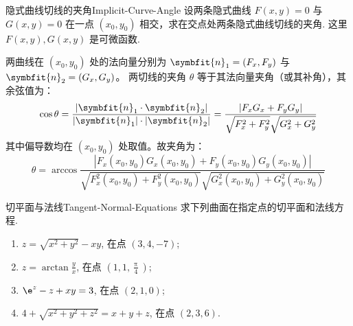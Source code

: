 \begin{problem}{隐式曲线切线的夹角}{Implicit-Curve-Angle}
    设两条隐式曲线 $F(x, y) = 0$ 与 $G(x, y) = 0$ 在一点 $(x_0, y_0)$ 相交，求在交点处两条隐式曲线切线的夹角. 这里 $F(x, y), G(x, y)$ 是可微函数.
\end{problem}

\begin{solution}
    两曲线在 $(x_0, y_0)$ 处的法向量分别为 $\symbfit{n}_1 = (F_x, F_y)$ 与 $\symbfit{n}_2 = (G_x, G_y)$。
    两切线的夹角 $\theta$ 等于其法向量夹角（或其补角），其余弦值为：
    \begin{equation}
        \cos \theta = \frac{|\symbfit{n}_1 \cdot \symbfit{n}_2|}{|\symbfit{n}_1| \cdot |\symbfit{n}_2|} = \frac{|F_x G_x + F_y G_y|}{\sqrt{F_x^2 + F_y^2} \sqrt{G_x^2 + G_y^2}}
    \end{equation}
    其中偏导数均在 $(x_0, y_0)$ 处取值。故夹角为：
    \begin{equation}
        \boxed{\theta = \arccos \frac{|F_x(x_0, y_0) G_x(x_0, y_0) + F_y(x_0, y_0) G_y(x_0, y_0)|}{\sqrt{F_x^2(x_0, y_0) + F_y^2(x_0, y_0)} \sqrt{G_x^2(x_0, y_0) + G_y^2(x_0, y_0)}}}
    \end{equation}
\end{solution}


\begin{problem}{切平面与法线}{Tangent-Normal-Equations}
    求下列曲面在指定点的切平面和法线方程.
    \begin{enumerate}
        \item $z = \sqrt{x^2 + y^2} - xy$, 在点 $(3, 4, -7)$;
        \item $z = \arctan \frac{y}{x}$, 在点 $(1, 1, \frac{\uppi}{4})$;
        \item $\e^z - z + xy = 3$, 在点 $(2, 1, 0)$;
        \item $4 + \sqrt{x^2 + y^2 + z^2} = x + y + z$, 在点 $(2, 3, 6)$.
    \end{enumerate}
\end{problem}

